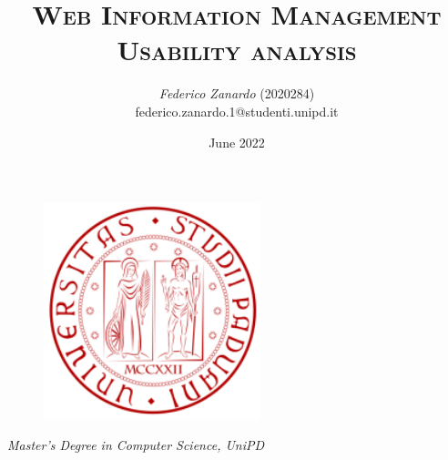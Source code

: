 \documentclass[12pt]{article}
\title{ \huge\textsc{Web Information Management} \\
		\large\textsc{Usability analysis}}
\author{\textit{Federico Zanardo} (2020284) \\
\small federico.zanardo.1@studenti.unipd.it}
\date{\small June 2022}
\renewcommand{\baselinestretch}{1.075}
\newcommand{\hr}{\par\vspace{-.1\ht\strutbox}\noindent\hrulefill\par}
\begin{document}
 

\begin{figure}[t!]
    \centering
    \includegraphics[height=17em]{res/images/logo.png}
\end{figure}

\maketitle 
\thispagestyle{empty}

\begin{center}
    \vspace{12em}
    \hr
    \textit{Master's Degree in Computer Science, UniPD}
\end{center}

\newpage
\renewcommand{\baselinestretch}{0.95}\normalsize
\tableofcontents
\renewcommand{\baselinestretch}{1.075}\normalsize

\newpage

\end{document}
